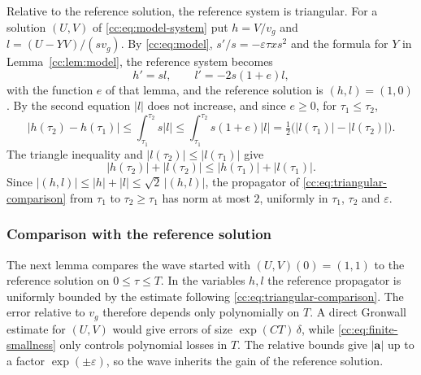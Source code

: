 Relative to the reference solution, the reference system is triangular.
For a solution $(U,V)$ of \eqref{cc:eq:model-system} put $h=V/v_g$ and
$l=(U-YV)/(sv_g)$. By \eqref{cc:eq:model}, $s'/s=-\varepsilon\tau xs^2$
and the formula for $Y$ in Lemma~\ref{cc:lem:model}, the reference
system becomes
\begin{equation}\label{cc:eq:triangular-comparison}
 h'=sl,\qquad l'=-2s(1+e)l,
\end{equation}
with the function $e$ of that lemma, and the reference solution is
$(h,l)=(1,0)$. By the second equation $|l|$ does not increase, and
since $e\ge0$, for $\tau_1\le\tau_2$,
\[
 |h(\tau_2)-h(\tau_1)|\le\int_{\tau_1}^{\tau_2}s|l|
 \le\int_{\tau_1}^{\tau_2}s(1+e)|l|
 =\tfrac12\bigl(|l(\tau_1)|-|l(\tau_2)|\bigr).
\]
The triangle inequality and $|l(\tau_2)|\le|l(\tau_1)|$ give
\[
 |h(\tau_2)|+|l(\tau_2)|\le|h(\tau_1)|+|l(\tau_1)|.
\]
Since $|(h,l)|\le|h|+|l|\le\sqrt2\,|(h,l)|$, the propagator of
\eqref{cc:eq:triangular-comparison} from
$\tau_1$ to $\tau_2\ge\tau_1$ has norm at most $2$, uniformly in
$\tau_1$, $\tau_2$ and $\varepsilon$.

\subsubsection{Comparison with the reference solution}
The next lemma compares the wave started with $(U,V)(0)=(1,1)$ to
the reference solution on $0\le\tau\le T$. In the variables $h,l$
the reference propagator is uniformly bounded by the estimate following
\eqref{cc:eq:triangular-comparison}. The error relative to $v_g$
therefore depends only polynomially on $T$. A direct Gronwall estimate
for $(U,V)$ would give errors of size $\exp(CT)\,\delta$, while
\eqref{cc:eq:finite-smallness} only controls polynomial losses in $T$. The relative
bounds give $|\mathbf a|$ up to a factor $\exp(\pm\varepsilon)$, so the
wave inherits the gain of the reference solution.

